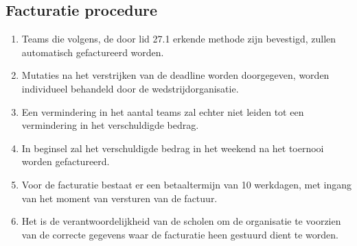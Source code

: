 \subsection{Facturatie procedure}

\begin{enumerate}
\item Teams die volgens, de door lid 27.1 erkende methode zijn bevestigd, zullen automatisch gefactureerd worden.
\item Mutaties na het verstrijken van de deadline worden doorgegeven, worden individueel behandeld door de wedstrijdorganisatie. 
\item Een vermindering in het aantal teams zal echter niet leiden tot een vermindering in het verschuldigde bedrag.
\item In beginsel zal het verschuldigde bedrag in het weekend na het toernooi worden gefactureerd.
\item Voor de facturatie bestaat er een betaaltermijn van 10 werkdagen, met ingang van het moment van versturen van de factuur. 
\item Het is de verantwoordelijkheid van de scholen om de organisatie te voorzien van de correcte gegevens waar de facturatie heen gestuurd dient te worden. 
\end{enumerate}
